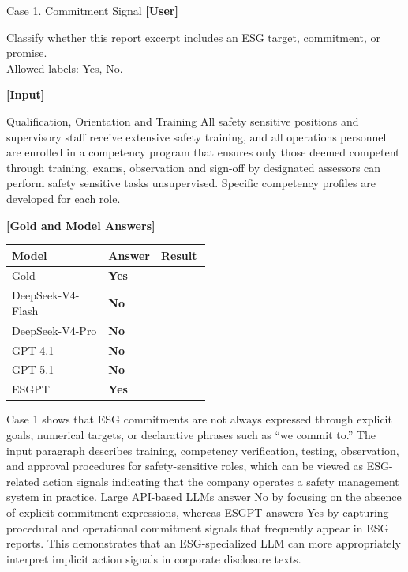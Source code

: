 \documentclass[11pt]{article}
\newcommand{\cmarkblue}{\textcolor{caseblue}{\ding{51}}}
\newcommand{\xmarkred}{\textcolor{casered}{\ding{55}}}
\newcommand{\goldans}[1]{\textbf{#1}}
\newcommand{\correctans}[1]{\textcolor{caseblue}{\textbf{#1}}}
\newcommand{\wrongans}[1]{\textcolor{casered}{\textbf{#1}}}
\begin{document}

\begin{qualcasebox}{Case 1. Commitment Signal}
\small
\textbf{[User]}

\footnotesize
Classify whether this report excerpt includes an ESG target, commitment, or promise.\\
Allowed labels: Yes, No.

\vspace{0.6em}
\textbf{[Input]}

\footnotesize
Qualification, Orientation and Training All safety sensitive positions and supervisory staff receive extensive safety training, and all operations personnel are enrolled in a competency program that ensures only those deemed competent through training, exams, observation and sign-off by designated assessors can perform safety sensitive tasks unsupervised. Specific competency profiles are developed for each role.

\tcblower

\small
\textbf{[Gold and Model Answers]}

\vspace{0.2em}
\footnotesize
\begin{tabularx}{1.0\linewidth}{@{}Y C{0.25\linewidth} C{0.25\linewidth}@{}}
\hline
\textbf{Model} & \textbf{Answer} & \textbf{Result} \\
\hline
Gold & \goldans{Yes} & -- \\
\hline
DeepSeek-V4-Flash & \wrongans{No} & \xmarkred \\
DeepSeek-V4-Pro & \wrongans{No} & \xmarkred \\
GPT-4.1 & \wrongans{No} & \xmarkred \\
GPT-5.1 & \wrongans{No} & \xmarkred \\
\textsf{ESGPT} & \correctans{Yes} & \cmarkblue \\
\hline
\end{tabularx}
\end{qualcasebox}
Case 1 shows that ESG commitments are not always expressed through explicit goals, numerical targets, or declarative phrases such as ``we commit to.'' The input paragraph describes training, competency verification, testing, observation, and approval procedures for safety-sensitive roles, which can be viewed as ESG-related action signals indicating that the company operates a safety management system in practice. Large API-based LLMs answer No by focusing on the absence of explicit commitment expressions, whereas \textsf{ESGPT} answers Yes by capturing procedural and operational commitment signals that frequently appear in ESG reports. This demonstrates that an ESG-specialized LLM can more appropriately interpret implicit action signals in corporate disclosure texts.
\end{document}
